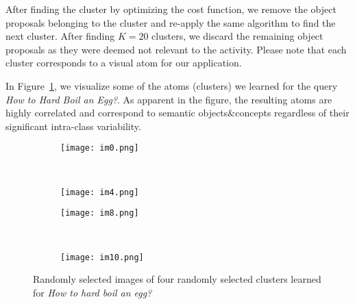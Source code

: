 After finding the cluster by optimizing the cost function, we remove the object proposals belonging to the cluster and re-apply the same algorithm to find the next cluster. After finding $K=20$ clusters, we discard the remaining object proposals as they were deemed not relevant to the activity. Please note that each cluster corresponds to a visual atom for our application.

In Figure~\ref{cvis}, we visualize some of the atoms (\ie clusters) we learned for the query \emph{How to Hard Boil an Egg?}. As apparent in the figure, the resulting atoms are highly correlated and correspond to semantic objects\&concepts regardless of their significant intra-class variability.
\begin{figure}[ht]
  \begin{subfigure}[b]{0.23\textwidth}
\texttt{[image: im0.png]}
\end{subfigure}
~
\begin{subfigure}[b]{0.23\textwidth}
\texttt{[image: im4.png]}
\end{subfigure}


\begin{subfigure}[b]{0.23\textwidth}
\texttt{[image: im8.png]}
\end{subfigure}
~
\begin{subfigure}[b]{0.23\textwidth}
\texttt{[image: im10.png]}
\end{subfigure}
\caption{Randomly selected images of four randomly selected clusters learned for \emph{How to hard boil an egg?}}
\label{cvis}
\end{figure}
